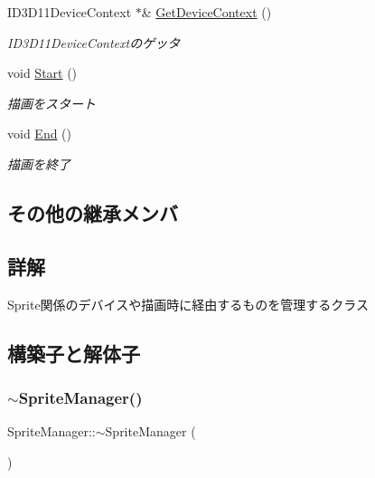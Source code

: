 \begin{DoxyCompactItemize}
I\+D3\+D11\+Device\+Context $\ast$\& \mbox{\hyperlink{class_sprite_manager_a6bad23e380818dbe6b521adc07ab84fa}{Get\+Device\+Context}} ()
\begin{DoxyCompactList}\small\item\em I\+D3\+D11\+Device\+Contextのゲッタ \end{DoxyCompactList}\item 
void \mbox{\hyperlink{class_sprite_manager_a6b387e8736713264f6d590082cd492cb}{Start}} ()
\begin{DoxyCompactList}\small\item\em 描画をスタート \end{DoxyCompactList}\item 
void \mbox{\hyperlink{class_sprite_manager_afed8a96a6530f67123a4efa1b6d77032}{End}} ()
\begin{DoxyCompactList}\small\item\em 描画を終了 \end{DoxyCompactList}\end{DoxyCompactItemize}
\subsection*{その他の継承メンバ}


\subsection{詳解}
Sprite関係のデバイスや描画時に経由するものを管理するクラス 

\subsection{構築子と解体子}
\mbox{\label{class_sprite_manager_ae01a31b1c80f676604ba55c93b499e1f}} 
\subsubsection{\texorpdfstring{$\sim$\+Sprite\+Manager()}{~SpriteManager()}}
{\footnotesize\ttfamily Sprite\+Manager\+::$\sim$\+Sprite\+Manager (\begin{DoxyParamCaption}{ }\end{DoxyParamCaption})}



